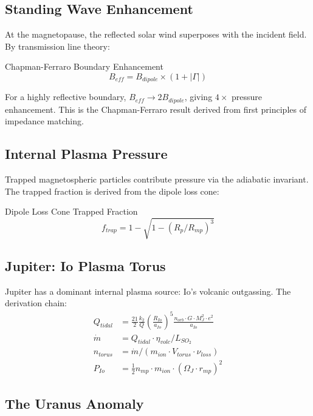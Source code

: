 \subsection{Standing Wave Enhancement}

At the magnetopause, the reflected solar wind superposes with the
incident field.  By transmission line theory:
\begin{resultbox}{Chapman-Ferraro Boundary Enhancement}
\begin{equation}
    B_{eff} = B_{dipole} \times (1 + |\Gamma|)
\end{equation}
\end{resultbox}
For a highly reflective boundary, $B_{eff} \to 2 B_{dipole}$, giving
$4\times$ pressure enhancement.  This is the Chapman-Ferraro result
derived from first principles of impedance matching.

\subsection{Internal Plasma Pressure}

Trapped magnetospheric particles contribute pressure via the adiabatic
invariant.  The trapped fraction is derived from the dipole loss cone:
\begin{resultbox}{Dipole Loss Cone Trapped Fraction}
\begin{equation}
    f_{trap} = 1 - \sqrt{1 - (R_p/R_{mp})^3}
\end{equation}
\end{resultbox}

\subsection{Jupiter: Io Plasma Torus}

Jupiter has a dominant internal plasma source: Io's volcanic
outgassing.  The derivation chain:
\begin{align}
    Q_{tidal} &= \frac{21}{2}\frac{k_2}{Q}\left(\frac{R_{Io}}{a_{Io}}\right)^5
    \frac{n_{orb} \cdot G \cdot M_J^2 \cdot e^2}{a_{Io}} \\
    \dot{m} &= Q_{tidal} \cdot \eta_{volc} / L_{SO_2} \\
    n_{torus} &= \dot{m} / (m_{ion} \cdot V_{torus} \cdot \nu_{loss}) \\
    P_{Io} &= \frac{1}{2} n_{mp} \cdot m_{ion} \cdot (\Omega_J \cdot r_{mp})^2
\end{align}

\subsection{The Uranus Anomaly}

